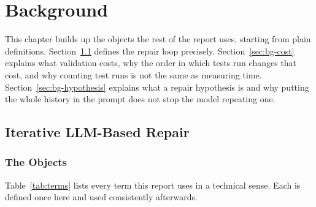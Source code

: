 \chapter{Background}
\label{ch:background}

This chapter builds up the objects the rest of the report uses, starting from
plain definitions. Section~\ref{sec:bg-loop} defines the repair loop precisely.
Section~\ref{sec:bg-cost} explains what validation costs, why the order in
which tests run changes that cost, and why counting test runs is not the same as
measuring time. Section~\ref{sec:bg-hypothesis} explains what a repair
hypothesis is and why putting the whole history in the prompt does not stop the
model repeating one.

\section{Iterative LLM-Based Repair}
\label{sec:bg-loop}

\subsection{The Objects}

Table~\ref{tab:terms} lists every term this report uses in a technical sense.
Each is defined once here and used consistently afterwards.

